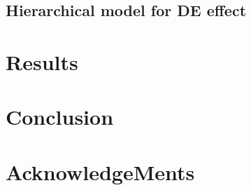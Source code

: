 \documentclass[11pt, a4paper]{article}
\begin{document}
\subsection{Hierarchical model for DE effect}


\section{Results}\label{section:results}

\section{Conclusion}\label{section:conclusion}

\section{AcknowledgeMents}\label{section:acknowledgement}
\end{document}
